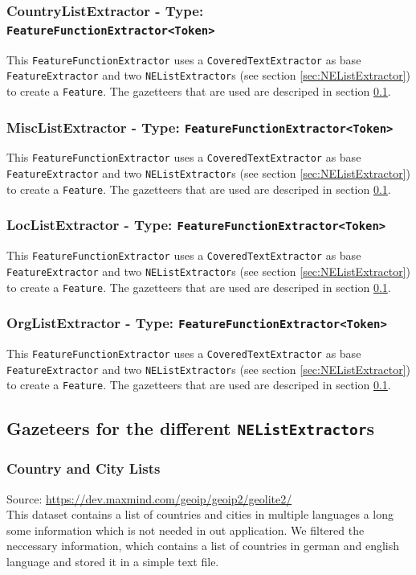 \documentclass[11pt, english]{article}
\begin{document}
\subsubsection*{CountryListExtractor - Type: \texttt{FeatureFunctionExtractor<Token>}}
This \verb/FeatureFunctionExtractor/ uses a \verb/CoveredTextExtractor/ as base \verb/FeatureExtractor/ and two \verb/NEListExtractor/s (see section \ref{sec:NEListExtractor}) to create a \verb/Feature/. The gazetteers that are used are descriped in section \ref{sec:Gazetteers}.

\subsubsection*{MiscListExtractor - Type: \texttt{FeatureFunctionExtractor<Token>}}
This \verb/FeatureFunctionExtractor/ uses a \verb/CoveredTextExtractor/ as base \verb/FeatureExtractor/ and two \verb/NEListExtractor/s (see section \ref{sec:NEListExtractor}) to create a \verb/Feature/. The gazetteers that are used are descriped in section \ref{sec:Gazetteers}.

\subsubsection*{LocListExtractor - Type: \texttt{FeatureFunctionExtractor<Token>}}
This \verb/FeatureFunctionExtractor/ uses a \verb/CoveredTextExtractor/ as base \verb/FeatureExtractor/ and two \verb/NEListExtractor/s (see section \ref{sec:NEListExtractor}) to create a \verb/Feature/. The gazetteers that are used are descriped in section \ref{sec:Gazetteers}.

\subsubsection*{OrgListExtractor - Type: \texttt{FeatureFunctionExtractor<Token>}}
This \verb/FeatureFunctionExtractor/ uses a \verb/CoveredTextExtractor/ as base \verb/FeatureExtractor/ and two \verb/NEListExtractor/s (see section \ref{sec:NEListExtractor}) to create a \verb/Feature/. The gazetteers that are used are descriped in section \ref{sec:Gazetteers}.

\subsection{Gazeteers for the different \texttt{NEListExtractor}s}
\label{sec:Gazetteers}

\subsubsection*{Country and City Lists}
Source: \url{https://dev.maxmind.com/geoip/geoip2/geolite2/}\\
This dataset contains a list of countries and cities in multiple languages a long some information which is not needed in out application. We filtered the neccessary information, which contains a list of countries in german and english language and stored it in a simple text file.
\end{document}
